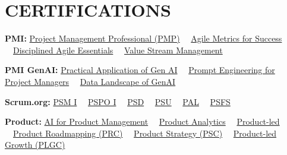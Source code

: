 \documentclass[10pt,letterpaper]{article}
\begin{document}
\section{CERTIFICATIONS}
\textbf{PMI:} \href{https://www.credly.com/badges/57c77063-0cef-4b7a-9dde-b9907b5479f8/public_url}{Project Management Professional (PMP)} \ \textbar\ \href{https://www.credly.com/badges/47d5fa0a-0374-4b0c-9532-802cbb0ec95e/public_url}{Agile Metrics for Success} \ \textbar\ \href{https://www.credly.com/badges/f86005f2-783c-48a1-94f6-801e37a1ce60/public_url}{Disciplined Agile Essentials} \ \textbar\ \href{https://www.credly.com/badges/829a1e46-0be7-42aa-a3c9-f036f5e6713f/public_url}{Value Stream Management}\par
\vspace{1pt}
\textbf{PMI GenAI:} \href{https://www.credly.com/badges/6753b402-a2eb-4240-8eae-220987d95a69/public_url}{Practical Application of Gen AI} \ \textbar\ \href{https://www.credly.com/badges/ba2e0800-a7a1-4d25-a135-5cd0107056bc/public_url}{Prompt Engineering for Project Managers} \ \textbar\ \href{https://www.credly.com/badges/d33adc1f-876f-4e54-b12f-80bba9fba461/public_url}{Data Landscape of GenAI}\par
\vspace{1pt}
\textbf{Scrum.org:} \href{https://www.credly.com/badges/d21135e4-80ee-4c03-be13-6611aff304b3/public_url}{PSM I} \ \textbar\ \href{https://www.credly.com/badges/b05ea15d-927c-4c55-a15c-d5eb6f04784f/public_url}{PSPO I} \ \textbar\ \href{https://www.credly.com/badges/3ea72efd-f83b-4dad-8e09-31ec845e9473/public_url}{PSD} \ \textbar\ \href{https://www.credly.com/badges/62e831e2-2006-430f-a6d8-d365347bf71a/public_url}{PSU} \ \textbar\ \href{https://www.credly.com/badges/3706166e-aa69-4c0a-9e7e-8d84a6d2a81d/public_url}{PAL} \ \textbar\ \href{https://www.credly.com/badges/8542a9ff-cb8c-4d37-89bb-cadf8455ab17/public_url}{PSFS}\par
\vspace{1pt}
\textbf{Product:} \href{https://www.credly.com/badges/47d24682-6229-4e2f-aeeb-d5d517604f71/public_url}{AI for Product Management} \ \textbar\ \href{https://www.credly.com/badges/b31053b5-2114-41e6-a76c-b3acbdd12e3c/public_url}{Product Analytics} \ \textbar\ \href{https://www.credly.com/badges/1f2a65a5-caa9-4576-8ce1-76b6d3cb8f24/public_url}{Product-led} \ \textbar\ \href{https://berkayvuran.com/assets/appendices/prc.pdf}{Product Roadmapping (PRC)} \ \textbar\ \href{https://berkayvuran.com/assets/appendices/psc.pdf}{Product Strategy (PSC)} \ \textbar\ \href{https://berkayvuran.com/assets/appendices/plgc.pdf}{Product-led Growth (PLGC)}
\end{document}
